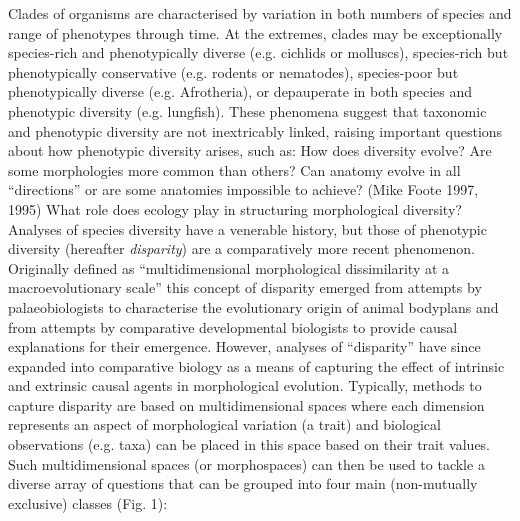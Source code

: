 \documentclass[12pt,letterpaper]{article}
\begin{document}
\noindent Clades of organisms are characterised by variation in both numbers of species and range of phenotypes through time.
At the extremes, clades may be exceptionally species-rich and phenotypically diverse (e.g. cichlids or molluscs), species-rich but phenotypically conservative (e.g. rodents or nematodes), species-poor but phenotypically diverse (e.g. Afrotheria), or depauperate in both species and phenotypic diversity (e.g. lungfish).
These phenomena suggest that taxonomic and phenotypic diversity are not inextricably linked, raising important questions about how phenotypic diversity arises, such as:
How does diversity evolve?
Are some morphologies more common than others?
Can anatomy evolve in all ``directions'' or are some anatomies impossible to achieve? (Mike Foote 1997, 1995)
What role does ecology play in structuring morphological diversity?
Analyses of species diversity have a venerable history, but those of phenotypic diversity (hereafter \emph{disparity}) are a comparatively more recent phenomenon. Originally defined as ``multidimensional morphological dissimilarity at a macroevolutionary scale'' \citep{runnegar1987rates,Gould1991-nh} this concept of disparity emerged from attempts by palaeobiologists to characterise the evolutionary origin of animal bodyplans and from attempts by comparative developmental biologists to provide causal explanations for their emergence.
However, analyses of ``disparity'' have since expanded into comparative biology as a means of capturing the effect of intrinsic and extrinsic causal agents in morphological evolution.
Typically, methods to capture disparity are based on multidimensional spaces where each dimension represents an aspect of morphological variation (a trait) and biological observations (e.g. taxa) can be placed in this space based on their trait values.
Such multidimensional spaces (or morphospaces) can then be used to tackle a diverse array of questions that can be grouped into four main (non-mutually exclusive) classes (Fig. 1):
\end{document}
